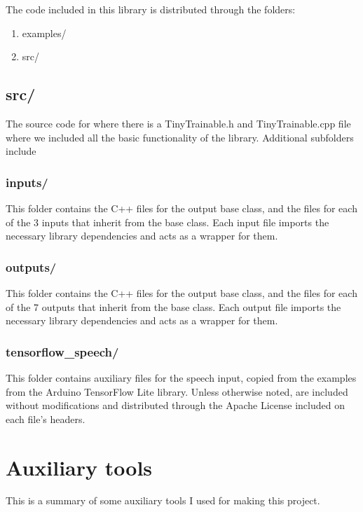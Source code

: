 The code included in this library is distributed through the folders:

\begin{enumerate}
  \item examples/
  \item src/
\end{enumerate}

\subsection{src/}

The source code for where there is a TinyTrainable.h and TinyTrainable.cpp file where we included all the basic functionality of the library. Additional subfolders include

\subsubsection{inputs/}

This folder contains the C++ files for the output base class, and the files for each of the 3 inputs that inherit from the base class. Each input file imports the necessary library dependencies and acts as a wrapper for them.

\subsubsection{outputs/}

This folder contains the C++ files for the output base class, and the files for each of the 7 outputs that inherit from the base class. Each output file imports the necessary library dependencies and acts as a wrapper for them.

\subsubsection{tensorflow{\_}speech/}

This folder contains auxiliary files for the speech input, copied from the examples from the Arduino TensorFlow Lite library. Unless otherwise noted, are included without modifications and distributed through the Apache License included on each file's headers.

\section{Auxiliary tools}

This is a summary of some auxiliary tools I used for making this project.

